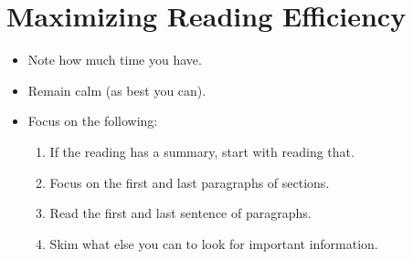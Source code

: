 \section{Maximizing Reading Efficiency}

\begin{itemize}
    \item Note how much time you have.
    \item Remain calm (as best you can).
    \item Focus on the following:
    \begin{enumerate}
        \item If the reading has a summary, start with reading that.
        \item Focus on the first and last paragraphs of sections.
        \item Read the first and last sentence of paragraphs.
        \item Skim what else you can to look for important information.
    \end{enumerate}
\end{itemize}